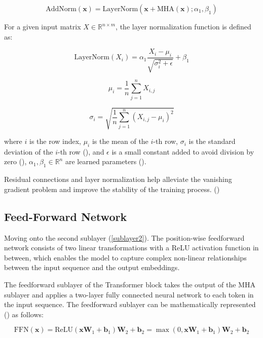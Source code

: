 $$\text{AddNorm}(\mathbf{x}) = \text{LayerNorm}(\mathbf{x} + \text{MHA}(\mathbf{x}); \alpha_1, \beta_1)$$

For a given input matrix $ X \in \mathbb{R}^
{n \times m}$, the layer normalization function is defined as:

\begin{equation} \label{layernorm}
    \mathrm{LayerNorm}(X_{i}) = \alpha_1\frac{X_{i} - \mu_i}{\sqrt{\sigma_i^2 + \epsilon}} + \beta_1 
\end{equation}

$$\mu_i = \frac{1}{n}\sum_{j=1}^n X_{i,j}$$

$$\sigma_i = \sqrt{\frac{1}{n}\sum_{j=1}^n (X_{i,j}-\mu_i)^2}$$

where $i$ is the row index, $\mu_i$ is the mean of the $i$-th row, $\sigma_i$ is the standard deviation of the $i$-th row (\cite{thickstun_transformer_2020}), and $\epsilon$ is a small constant added to avoid division by zero (\cite{huang_annotated_2022}), $\alpha_1, \beta_1 \in \mathbb{R}^{n}$ are learned parameters (\cite{thickstun_transformer_2020}).

Residual connections and layer normalization help alleviate the vanishing gradient problem and improve the stability of the training process. (\cite{vaswani_attention_2017})

\subsection{Feed-Forward Network}

Moving onto the second sublayer (\ref{sublayer2}).
The position-wise feedforward network consists of two linear transformations with a ReLU activation function in between, which enables the model to capture complex non-linear relationships between the input sequence and the output embeddings.

The feedforward sublayer of the Transformer block takes the output of the MHA sublayer and applies a two-layer fully connected neural network to each token in the input sequence. The feedforward sublayer can be mathematically represented (\cite{vaswani_attention_2017}) as follows:

\begin{equation}
    \text{FFN}(\mathbf{x}) = \text{ReLU}(\mathbf{x} \mathbf{W}_1 + \mathbf{b}_1) \mathbf{W}_2 + \mathbf{b}_2 
     = \max(0, \mathbf{x} \mathbf{W}_1 + \mathbf{b}_1) \mathbf{W}_2 + \mathbf{b}_2
\end{equation}


